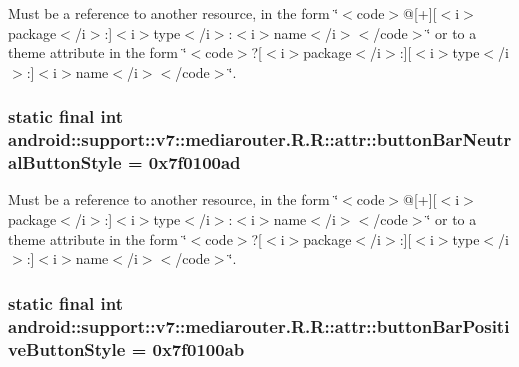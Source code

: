 Must be a reference to another resource, in the form \char`\"{}$<$code$>$@\mbox{[}+\mbox{]}\mbox{[}$<$i$>$package$<$/i$>$:\mbox{]}$<$i$>$type$<$/i$>$:$<$i$>$name$<$/i$>$$<$/code$>$\char`\"{} or to a theme attribute in the form \char`\"{}$<$code$>$?\mbox{[}$<$i$>$package$<$/i$>$:\mbox{]}\mbox{[}$<$i$>$type$<$/i$>$:\mbox{]}$<$i$>$name$<$/i$>$$<$/code$>$\char`\"{}. \hypertarget{classandroid_1_1support_1_1v7_1_1mediarouter_1_1_r_1_1attr_4b77c4c1dbc5c889e9c03239c5bac3b5}{
\subsubsection[{buttonBarNeutralButtonStyle}]{\setlength{\rightskip}{0pt plus 5cm}static final int android::support::v7::mediarouter.R.R::attr::buttonBarNeutralButtonStyle = 0x7f0100ad}}
\label{classandroid_1_1support_1_1v7_1_1mediarouter_1_1_r_1_1attr_4b77c4c1dbc5c889e9c03239c5bac3b5}


Must be a reference to another resource, in the form \char`\"{}$<$code$>$@\mbox{[}+\mbox{]}\mbox{[}$<$i$>$package$<$/i$>$:\mbox{]}$<$i$>$type$<$/i$>$:$<$i$>$name$<$/i$>$$<$/code$>$\char`\"{} or to a theme attribute in the form \char`\"{}$<$code$>$?\mbox{[}$<$i$>$package$<$/i$>$:\mbox{]}\mbox{[}$<$i$>$type$<$/i$>$:\mbox{]}$<$i$>$name$<$/i$>$$<$/code$>$\char`\"{}. \hypertarget{classandroid_1_1support_1_1v7_1_1mediarouter_1_1_r_1_1attr_ed6e2f26fd61d6eab7cf50536ebf42f7}{
\subsubsection[{buttonBarPositiveButtonStyle}]{\setlength{\rightskip}{0pt plus 5cm}static final int android::support::v7::mediarouter.R.R::attr::buttonBarPositiveButtonStyle = 0x7f0100ab}}
\label{classandroid_1_1support_1_1v7_1_1mediarouter_1_1_r_1_1attr_ed6e2f26fd61d6eab7cf50536ebf42f7}



